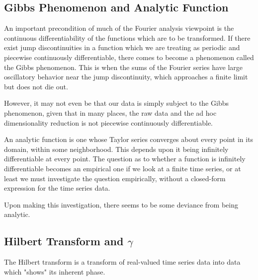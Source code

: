 \documentclass[12pt]{article}
\begin{document}

\subsection{Gibbs Phenomenon and Analytic Function}

An important precondition of much of the Fourier analysis viewpoint is the continuous differentiability of the functions which are to be transformed. If there exist jump discontinuities in a function which we are treating as periodic and piecewise continuously differentiable, there comes to become a phenomenon called the Gibbs phenomenon. This is when the sums of the Fourier series have  large oscillatory behavior near the jump discontinuity, which approaches a finite limit but does not die out. %

However, it may not even be that our data is simply subject to the Gibbs phenomenon, given that in many places, the raw data and the ad hoc dimensionality reduction is not piecewise continuously differentiable. %

An analytic function is one whose Taylor series converges about every point in its domain, within some neighborhood. This depends upon it being infinitely differentiable at every point. The question as to whether a function is infinitely differentiable becomes an empirical one if we look at a finite time series, or at least we must investigate the question empirically, without a closed-form expression for the time series data.

Upon making this investigation, there seems to be some deviance from being analytic.


\subsection{Hilbert Transform and $\gamma$}

The Hilbert transform is a transform of real-valued time series data into data which "shows" its inherent phase. %




\end{document}
